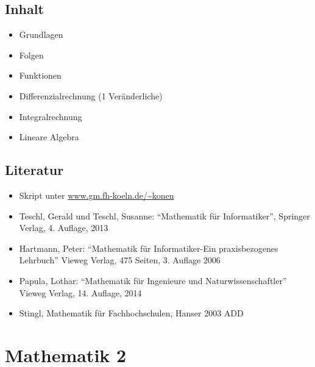 \hypertarget{inhaltpathlabelmi-2017modulbeschreibungen-bachelorba_mathematik1}{%
\section*{Inhalt\label{/mi-2017/modulbeschreibungen-bachelor/BA_Mathematik1}}\label{inhaltpathlabelmi-2017modulbeschreibungen-bachelorba_mathematik1}}

\begin{itemize}
\tightlist
\item
  Grundlagen
\item
  Folgen
\item
  Funktionen
\item
  Differenzialrechnung (1 Veränderliche)
\item
  Integralrechnung
\item
  Lineare Algebra
\end{itemize}

\hypertarget{literaturpathlabelmi-2017modulbeschreibungen-bachelorba_mathematik1}{%
\section*{Literatur\label{/mi-2017/modulbeschreibungen-bachelor/BA_Mathematik1}}\label{literaturpathlabelmi-2017modulbeschreibungen-bachelorba_mathematik1}}

\begin{itemize}
\tightlist
\item
  Skript unter
  \href{http://www.gm.fh-koeln.de/~konen}{www.gm.fh-koeln.de/\textasciitilde konen}
\item
  Teschl, Gerald und Teschl, Susanne: ``Mathematik für Informatiker'',
  Springer Verlag, 4. Auflage, 2013
\item
  Hartmann, Peter: ``Mathematik für Informatiker-Ein praxisbezogenes
  Lehrbuch'' Vieweg Verlag, 475 Seiten, 3. Auflage 2006
\item
  Papula, Lothar: ``Mathematik für Ingenieure und Naturwissenschaftler''
  Vieweg Verlag, 14. Auflage, 2014
\item
  Stingl, Mathematik für Fachhochschulen, Hanser 2003 ADD
\end{itemize}

\hypertarget{mathematik-2pathlabelmi-2017modulbeschreibungen-bachelorba_mathematik2}{%
\chapter{Mathematik
2\label{/mi-2017/modulbeschreibungen-bachelor/BA_Mathematik2}}\label{mathematik-2pathlabelmi-2017modulbeschreibungen-bachelorba_mathematik2}}

